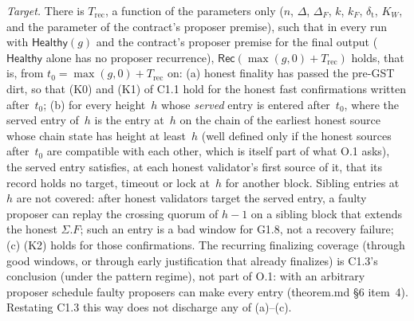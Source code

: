 \documentclass{article}
\begin{document}
\emph{Target.}  There is $T_{\mathrm{rec}}$, a function of the parameters
only ($n$, $\Delta$, $\Delta_F$, $k$, $k_F$, $\delta_{\mathrm t}$, $K_W$, and the
parameter of the contract's proposer premise),
such that in every run with $\mathsf{Healthy}(g)$ and the contract's proposer
premise for the final output ($\mathsf{Healthy}$ alone has no proposer
recurrence), $\mathsf{Rec}(\max(g,0)+T_{\mathrm{rec}})$ holds, that is, from
$t_0=\max(g,0)+T_{\mathrm{rec}}$ on: (a) honest finality has passed the
pre-GST dirt, so that (K0) and (K1) of C1.1 hold for the honest fast
confirmations written after~$t_0$; (b) for every height~$h$ whose
\emph{served} entry is entered after~$t_0$, where the served entry of~$h$ is
the entry at~$h$ on the chain of the earliest honest source whose chain state
has height at least~$h$ (well defined only if the honest sources after~$t_0$
are compatible with each other, which is itself part of what O.1 asks), the
served entry satisfies, at each honest
validator's first source of it, that its record holds no target, timeout or
lock at~$h$ for another block.  Sibling entries at~$h$ are not covered: after
honest validators target the served entry, a faulty proposer can replay the
crossing quorum of $h-1$ on a sibling block that extends the honest
$\Sigma.F$; such an entry is a bad window for G1.8, not a recovery failure; (c) (K2) holds for those confirmations.  The
recurring finalizing coverage (through good windows, or through early
justification that already finalizes) is C1.3's conclusion (under the pattern
regime), not part of O.1: with an arbitrary proposer schedule faulty proposers can make
every entry (theorem.md \S6 item~4).  Restating C1.3 this way does not
discharge any of (a)--(c).
\end{document}
